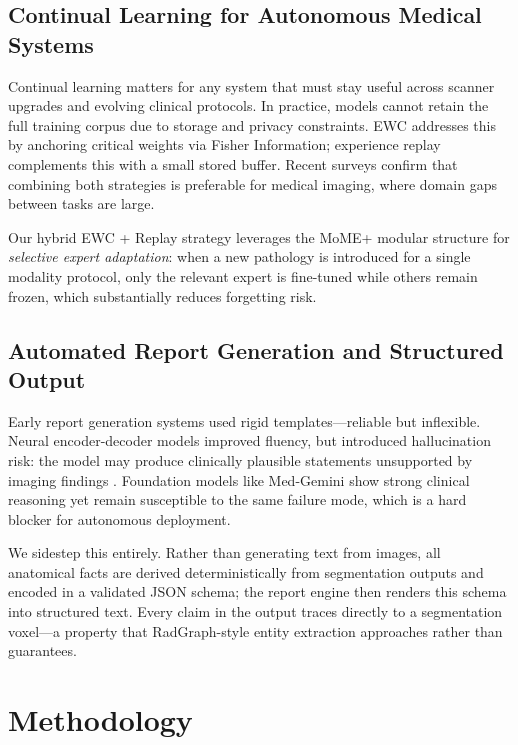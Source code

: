 \documentclass[conference]{IEEEtran}
\begin{document}
\subsection{Continual Learning for Autonomous Medical Systems}
Continual learning matters for any system that must stay useful across scanner upgrades and evolving clinical protocols. In practice, models cannot retain the full training corpus due to storage and privacy constraints. EWC \cite{kirkpatrick2017ewc} addresses this by anchoring critical weights via Fisher Information; experience replay \cite{rebuffi2017icarl} complements this with a small stored buffer. Recent surveys \cite{yuan2024continualmed} confirm that combining both strategies is preferable for medical imaging, where domain gaps between tasks are large.

Our hybrid EWC + Replay strategy leverages the MoME+ modular structure for \textit{selective expert adaptation}: when a new pathology is introduced for a single modality protocol, only the relevant expert is fine-tuned while others remain frozen, which substantially reduces forgetting risk.

\subsection{Automated Report Generation and Structured Output}
Early report generation systems used rigid templates---reliable but inflexible. Neural encoder-decoder models \cite{chen2020r2gen} improved fluency, but introduced hallucination risk: the model may produce clinically plausible statements unsupported by imaging findings \cite{singhal2023medpalm, mansoor2025reasoning}. Foundation models like Med-Gemini \cite{saab2024medgemini} show strong clinical reasoning yet remain susceptible to the same failure mode, which is a hard blocker for autonomous deployment.

We sidestep this entirely. Rather than generating text from images, all anatomical facts are derived deterministically from segmentation outputs and encoded in a validated JSON schema; the report engine then renders this schema into structured text. Every claim in the output traces directly to a segmentation voxel---a property that RadGraph-style entity extraction \cite{jain2021radgraph} approaches rather than guarantees.

\section{Methodology}
\end{document}
